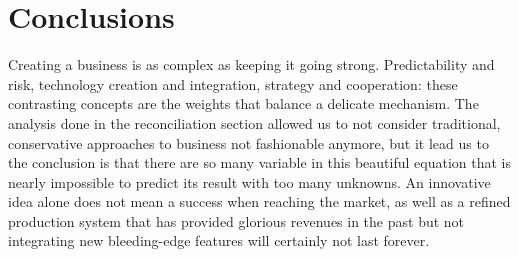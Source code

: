 \section{Conclusions}

Creating a business is as complex as keeping it going strong. Predictability and risk, technology creation and integration, strategy and cooperation: these contrasting concepts are the weights that balance a delicate mechanism. The analysis done in the reconciliation section allowed us to not consider traditional, conservative approaches to business not fashionable anymore, but it lead us to the conclusion is that there are so many variable in this beautiful equation that is nearly impossible to predict its result with too many unknowns. An innovative idea alone does not mean a success when reaching the market, as well as a refined production system that has provided glorious revenues in the past but not integrating new bleeding-edge features will certainly not last forever.